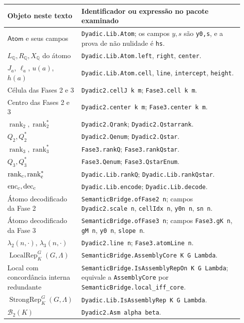 \documentclass[11pt,a4paper]{article}
\newcommand{\Q}{\mathbb Q}
\newcommand{\Atoms}{\mathsf{Atom}}
\newcommand{\Loc}{\operatorname{LocalRep}}
\newcommand{\Str}{\operatorname{StrongRep}}
\newcommand{\dec}{\operatorname{dec}}
\newcommand{\enc}{\operatorname{enc}}
\newcommand{\rankq}{\operatorname{rank}}
\newcommand{\code}[1]{\nolinkurl{#1}}
\begin{document}
\begin{longtable}{@{}>{\raggedright\arraybackslash}p{0.28\linewidth}>{\raggedright\arraybackslash}p{0.67\linewidth}@{}}
\toprule
Objeto neste texto & Identificador ou expressão no pacote examinado\\
\midrule
\endhead
$\Atoms$ e seus campos & \code{Dyadic.Lib.Atom}; os campos $y,s$ são
\code{y0,s}, e a prova de não nulidade é \code{hs}.\\
$L_\Q,R_\Q,X_\Q$ do átomo &
\code{Dyadic.Lib.Atom.left}, \code{right}, \code{center}.\\
$J_a$, $\ell_a$, $u(a)$, $h(a)$ &
\code{Dyadic.Lib.Atom.cell}, \code{line}, \code{intercept}, \code{height}.\\
Célula das Fases 2 e 3 &
\code{Dyadic2.cellJ k m}; \code{Fase3.cell k m}.\\
Centro das Fases 2 e 3 &
\code{Dyadic2.center k m}; \code{Fase3.center k m}.\\
$\rankq_2,\rankq_2^*$ &
\code{Dyadic2.Qrank}; \code{Dyadic2.Qstarrank}.\\
$Q_2,Q_2^*$ & \code{Dyadic2.Qenum}; \code{Dyadic2.Qstar}.\\
$\rankq_3,\rankq_3^*$ &
\code{Fase3.rankQ}; \code{Fase3.rankQstar}.\\
$Q_3,Q_3^*$ & \code{Fase3.Qenum}; \code{Fase3.QstarEnum}.\\
$\rankq_{\rm c},\rankq_{\rm c}^*$ &
\code{Dyadic.Lib.rankQ}; \code{Dyadic.Lib.rankQstar}.\\
$\enc_{\rm c},\dec_{\rm c}$ &
\code{Dyadic.Lib.encode}; \code{Dyadic.Lib.decode}.\\
Átomo decodificado da Fase 2 & \code{SemanticBridge.ofFase2 n}; campos
\code{Dyadic2.scale n}, \code{cellIdx n}, \code{y0n n}, \code{sn n}.\\
Átomo decodificado da Fase 3 & \code{SemanticBridge.ofFase3 n}; campos
\code{Fase3.gK n}, \code{gM n}, \code{y0 n}, \code{slope n}.\\
$\lambda_2(n,\cdot)$, $\lambda_3(n,\cdot)$ &
\code{Dyadic2.line n}; \code{Fase3.atomLine n}.\\
$\Loc^G_K(G,\Lambda)$ &
\code{SemanticBridge.AssemblyCore K G Lambda}.\\
Local com concordância interna redundante &
\code{SemanticBridge.IsAssemblyRepOn K G Lambda}; equivale a
\code{AssemblyCore} por \code{SemanticBridge.local_iff_core}.\\
$\Str^G_K(G,\Lambda)$ &
\code{Dyadic.Lib.IsAssemblyRep K G Lambda}.\\
$\mathcal B_2(K)$ & \code{Dyadic2.Asm alpha beta}.\\

\end{longtable}
\end{document}
